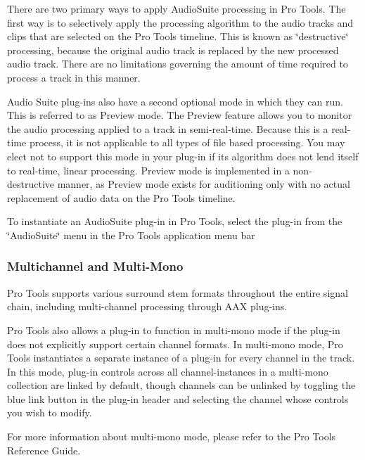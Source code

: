 There are two primary ways to apply Audio\+Suite processing in Pro Tools. The first way is to selectively apply the processing algorithm to the audio tracks and clips that are selected on the Pro Tools timeline. This is known as \char`\"{}destructive\char`\"{} processing, because the original audio track is replaced by the new processed audio track. There are no limitations governing the amount of time required to process a track in this manner.

Audio Suite plug-\/ins also have a second optional mode in which they can run. This is referred to as Preview mode. The Preview feature allows you to monitor the audio processing applied to a track in semi-\/real-\/time. Because this is a real-\/time process, it is not applicable to all types of file based processing. You may elect not to support this mode in your plug-\/in if its algorithm does not lend itself to real-\/time, linear processing. Preview mode is implemented in a non-\/ destructive manner, as Preview mode exists for auditioning only with no actual replacement of audio data on the Pro Tools timeline.

To instantiate an Audio\+Suite plug-\/in in Pro Tools, select the plug-\/in from the \char`\"{}\+Audio\+Suite\char`\"{} menu in the Pro Tools application menu bar

\hypertarget{a00360_subsection__multichannel_and_multimono}{}\subsubsection{Multichannel and Multi-\/\+Mono}\label{a00360_subsection__multichannel_and_multimono}
 Pro Tools supports various surround stem formats throughout the entire signal chain, including multi-\/channel processing through A\+A\+X plug-\/ins.

Pro Tools also allows a plug-\/in to function in multi-\/mono mode if the plug-\/in does not explicitly support certain channel formats. In multi-\/mono mode, Pro Tools instantiates a separate instance of a plug-\/in for every channel in the track. In this mode, plug-\/in controls across all channel-\/instances in a multi-\/mono collection are linked by default, though channels can be unlinked by toggling the blue link button in the plug-\/in header and selecting the channel whose controls you wish to modify.

For more information about multi-\/mono mode, please refer to the Pro Tools Reference Guide.



